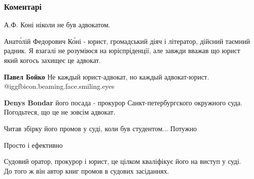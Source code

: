 
 
 
 
 
\subsubsection{Коментарі}

\begin{itemize} %
А.Ф. Коні ніколи не був адвокатом.

\begin{itemize} %
Анато́лій Федорович Ко́ні - юрист, громадський діяч і літератор, дійсний таємний радник. Я взагалі не розуміюся на юріспріденції, але завжди вважав що юрист який когось захищеє це адвокат.

\textbf{Павел Бойко} Не каждый юрист-адвокат, но каждый адвокат-юрист.  @igg{fbicon.beaming.face.smiling.eyes} 

\textbf{Denys Bondar} його посада - прокурор Санкт-петербургского окружного суда.
Погодьтеся, що це не зовсім адвокат.
\end{itemize} %


Читав збірку його промов у суді, коли був студентом... Потужно

Просто і ефективно

Судовий оратор, прокурор і юрист, це цілком кваліфікує його на виступ у суді. До того ж він автор книг промов в судових засіданнях.

\end{itemize} %

